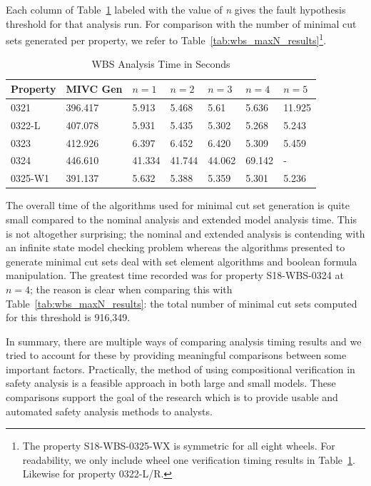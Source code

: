 Each column of Table~\ref{tab:wbs_mincut} labeled with the value of \textit{n} gives the fault hypothesis threshold for that analysis run. For comparison with the number of minimal cut sets generated per property, we refer to Table~\ref{tab:wbs_maxN_results}\footnote{The property S18-WBS-0325-WX is symmetric for all eight wheels. For readability, we only include wheel one verification timing results in Table~\ref{tab:wbs_mincut}. Likewise for property 0322-L/R.}.
\begin{table}[htbp]
\begin{center}
    \begin{tabular}{ | l | l | l | l | l | l | l |}
    \hline
    \textbf{Property} &  MIVC Gen & $n=1$ & $n=2$ & $n=3$ & $n=4$ & $n=5$     \\ \hline \hline
    0321 & 396.417 & 5.913 & 5.468 & 5.61 & 5.636 & 11.925  \\ \hline
    0322-L  & 407.078 & 5.931 & 5.435 & 5.302 & 5.268 & 5.243 \\ \hline
    0323 & 412.926 & 6.397 & 6.452 & 6.420  & 5.309 & 5.459\\ \hline
    0324 & 446.610 & 41.334 & 41.744 & 44.062 & 69.142 & -\\ \hline
    0325-W1 & 391.137 & 5.632 & 5.388 &5.359 &5.301 & 5.236 \\ \hline
    \end{tabular}
    \caption{WBS Analysis Time in Seconds}
    \label{tab:wbs_mincut}
    \end{center}
\end{table}

The overall time of the algorithms used for minimal cut set generation is quite small compared to the nominal analysis and extended model analysis time. This is not altogether surprising; the nominal and extended analysis is contending with an infinite state model checking problem whereas the algorithms presented to generate minimal cut sets deal with set element algorithms and boolean formula manipulation. The greatest time recorded was for property S18-WBS-0324 at $n = 4$; the reason is clear when comparing this with Table~\ref{tab:wbs_maxN_results}: the total number of minimal cut sets computed for this threshold is 916,349. 
 
In summary, there are multiple ways of comparing analysis timing results and we tried to account for these by providing meaningful comparisons between some important factors. Practically, the method of using compositional verification in safety analysis is a feasible approach in both large and small models. These comparisons support the goal of the research which is to provide usable and automated safety analysis methods to analysts. 






